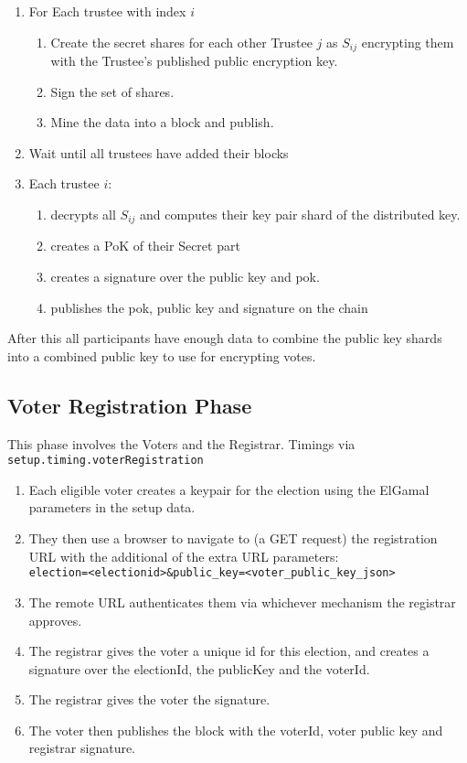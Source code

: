 \begin{enumerate}
    \item For Each trustee with index $i$
          \begin{enumerate}
              \item Create the secret shares for each other Trustee $j$ as $S_{ij}$ encrypting them with the Trustee's published public encryption key.
              \item Sign the set of shares.
              \item Mine the data into a block and publish.
          \end{enumerate}
    \item Wait until all trustees have added their blocks
    \item Each trustee $i$:
          \begin{enumerate}
              \item decrypts all $S_{ij}$ and computes their key pair shard of the distributed key.
              \item creates a PoK of their Secret part
              \item creates a signature over the public key and pok.
              \item publishes the pok, public key and signature on the chain
          \end{enumerate}
\end{enumerate}

After this all participants have enough data to combine the public key shards into a combined public key to use for encrypting votes.

\subsection{Voter Registration Phase}
\label{ch:astris:detail:registration}

This phase involves the Voters and the Registrar. Timings via \texttt{setup.timing.voterRegistration}


\begin{enumerate}
    \item Each eligible voter creates a keypair for the election using the ElGamal parameters in the setup data.
    \item They then use a browser to navigate to (a GET request) the registration URL with the additional of the extra URL parameters:\\ \verb|election=<electionid>&public_key=<voter_public_key_json>|
    \item The remote URL authenticates them via whichever mechanism the registrar approves.
    \item The registrar gives the voter a unique id for this election, and creates a signature over the electionId, the publicKey and the voterId.
    \item The registrar gives the voter the signature.
    \item The voter then publishes the block with the voterId, voter public key and registrar signature.
\end{enumerate}

